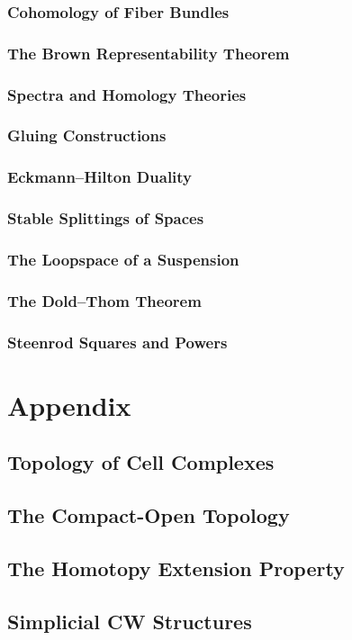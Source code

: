 \documentclass[11pt, a4paper]{article}
\begin{document}
\subsubsection{Cohomology of Fiber Bundles}

\subsubsection{The Brown Representability Theorem}

\subsubsection{Spectra and Homology Theories}

\subsubsection{Gluing Constructions}

\subsubsection{Eckmann--Hilton Duality}

\subsubsection{Stable Splittings of Spaces}

\subsubsection{The Loopspace of a Suspension}

\subsubsection{The Dold--Thom Theorem}

\subsubsection{Steenrod Squares and Powers}

\section*{Appendix}

\subsection*{Topology of Cell Complexes}

\subsection*{The Compact-Open Topology}

\subsection*{The Homotopy Extension Property}

\subsection*{Simplicial CW Structures}

\end{document}
